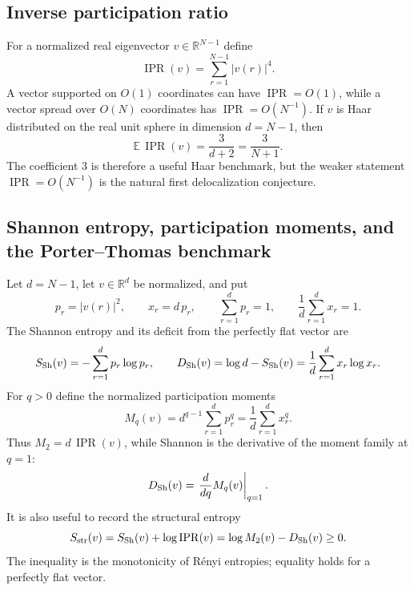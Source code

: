 \documentclass[11pt]{amsart}
\numberwithin{equation}{section}
\theoremstyle{plain}
\theoremstyle{definition}
\theoremstyle{remark}
\newcommand{\IPR}{\operatorname{IPR}}
\begin{document}
\subsection{Inverse participation ratio}
\label{subsec:ipr}

For a normalized real eigenvector $v\in\mathbb R^{N-1}$ define
\begin{equation}
\IPR(v)=\sum_{r=1}^{N-1}|v(r)|^4.
\label{eq:ipr_definition}
\end{equation}
A vector supported on $O(1)$ coordinates can have $\IPR=O(1)$, while a vector spread over $O(N)$ coordinates has $\IPR=O(N^{-1})$.  If $v$ is Haar distributed on the real unit sphere in dimension $d=N-1$, then
\begin{equation}
\mathbb E\,\IPR(v)=\frac{3}{d+2}=\frac{3}{N+1}.
\label{eq:haar_ipr}
\end{equation}
The coefficient $3$ is therefore a useful Haar benchmark, but the weaker statement $\IPR=O(N^{-1})$ is the natural first delocalization conjecture.


\subsection{Shannon entropy, participation moments, and the Porter--Thomas benchmark}
\label{subsec:shannon_porter_thomas}

Let $d=N-1$, let $v\in\mathbb R^d$ be normalized, and put
\begin{equation}
p_r=|v(r)|^2,
\qquad
x_r=d\,p_r,
\qquad
\sum_{r=1}^d p_r=1,
\qquad
\frac1d\sum_{r=1}^d x_r=1.
\label{eq:eigenvector_intensities}
\end{equation}
The Shannon entropy and its deficit from the perfectly flat vector are
\begin{equation}
S_{\rm Sh}(v)=-\sum_{r=1}^d p_r\log p_r,
\qquad
D_{\rm Sh}(v)=\log d-S_{\rm Sh}(v)
=\frac1d\sum_{r=1}^d x_r\log x_r.
\label{eq:shannon_deficit}
\end{equation}
For $q>0$ define the normalized participation moments
\begin{equation}
M_q(v)=d^{q-1}\sum_{r=1}^d p_r^q
=\frac1d\sum_{r=1}^d x_r^q.
\label{eq:participation_moments}
\end{equation}
Thus $M_2=d\,\IPR(v)$, while Shannon is the derivative of the moment family at $q=1$:
\begin{equation}
D_{\rm Sh}(v)=\left.\frac{d}{dq}M_q(v)\right|_{q=1}.
\label{eq:shannon_moment_derivative}
\end{equation}
It is also useful to record the structural entropy
\begin{equation}
S_{\rm str}(v)=S_{\rm Sh}(v)+\log\IPR(v)
=\log M_2(v)-D_{\rm Sh}(v)\ge0.
\label{eq:structural_entropy}
\end{equation}
The inequality is the monotonicity of R\'enyi entropies; equality holds for a perfectly flat vector.
\end{document}
